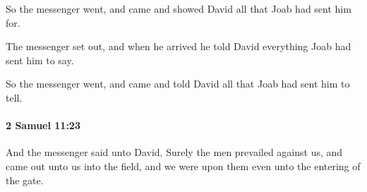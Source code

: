 			\begin{versebox}
					\item[BHS] 
					\item[ASV] So the messenger went, and came and showed David all that Joab had sent him for.
					\item[NIV] The messenger set out, and when he arrived he told David everything Joab had sent him to say.
					\item[NRSV] So the messenger went, and came and told David all that Joab had sent him to tell.
			\end{versebox}

		\paragraph{2 Samuel 11:23} %
			\label{2SAMUEL-11-23}

			And the messenger said unto David, Surely the men prevailed against us, and came out unto us into the field, and we were upon them even unto the entering of the gate.

